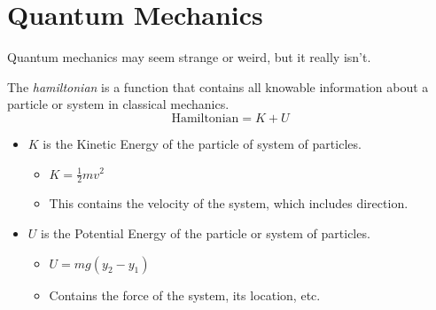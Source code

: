 \section{Quantum Mechanics} \label{sec:Quantum Mech}
Quantum mechanics may seem strange or weird, but it really isn't.
	\begin{definition}[Hamiltonian] \label{def:Hamiltonian}
		The \emph{hamiltonian} is a function that contains all knowable information about a particle or system in classical mechanics.
		\begin{equation} \label{eq:Hamiltonian}
			\text{Hamiltonian} = K+U
		\end{equation}
		\begin{itemize}[noitemsep, nolistsep]
			\item $K$ is the Kinetic Energy of the particle of system of particles.
			\begin{itemize}[noitemsep, nolistsep]
				\item $K = \frac{1}{2} mv^{2}$
				\item This contains the velocity of the system, which includes direction.
			\end{itemize}
			\item $U$ is the Potential Energy of the particle or system of particles.
			\begin{itemize}[noitemsep, nolistsep]
				\item $U = mg \left( y_{2} - y_{1} \right)$
				\item Contains the force of the system, its location, etc.
			\end{itemize}
		\end{itemize}
	\end{definition}

